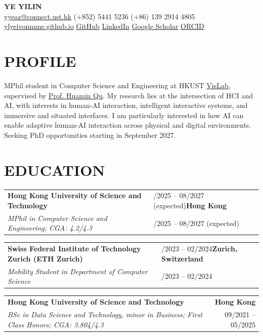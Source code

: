 \documentclass[9pt,a4paper]{extarticle}
\makeatletter
\newcommand{\cventry}[5]{%
  \begin{tabularx}{\textwidth}{@{}X>{\raggedleft\arraybackslash}p{5.0cm}@{}}
    \textbf{#1} & \if\relax\detokenize{#2}\relax #4\else\textbf{#2}\fi \\
    \textit{#3} & \if\relax\detokenize{#2}\relax\else #4\fi
  \end{tabularx}
  #5\par\vspace{0.8pt}
}
\makeatother
\begin{document}
\pagestyle{empty}
\fontsize{9.5}{10.5}\selectfont

\begin{center}
  {\fontsize{19}{21}\selectfont\bfseries YE YILIN}\\[4pt]
  \href{mailto:yyeaz@connect.ust.hk}{yyeaz@connect.ust.hk}
  \enspace\textbar\enspace (+852) 5441 5236
  \enspace\textbar\enspace (+86) 139 2914 4805\\[2pt]
  \href{https://ylyeivonnnne.github.io}{ylyeivonnnne.github.io}
  \enspace\textbar\enspace
  \href{https://github.com/ylyeivonnnne}{GitHub}
  \enspace\textbar\enspace
  \href{https://www.linkedin.com/in/yilin-ye-811ab0252/}{LinkedIn}
  \enspace\textbar\enspace
  \href{https://scholar.google.com/citations?hl=en&user=fhwz3soAAAAJ}{Google Scholar}
  \enspace\textbar\enspace
  \href{https://orcid.org/0009-0000-9986-4420}{ORCID}
\end{center}
\vspace{-5pt}

\section{PROFILE}

MPhil student in Computer Science and Engineering at HKUST \href{http://vis.cse.ust.hk/index.html}{VisLab}, supervised by \href{http://huamin.org}{Prof. Huamin Qu}. My research lies at the intersection of HCI and AI, with interests in human-AI interaction, intelligent interactive systems, and immersive and situated interfaces. I am particularly interested in how AI can enable adaptive human-AI interaction across physical and digital environments. Seeking PhD opportunities starting in September 2027.

\section{EDUCATION}

\cventry{Hong Kong University of Science and Technology}{Hong Kong}{MPhil in Computer Science and Engineering; CGA: 4.2/4.3}{09/2025 -- 08/2027 (expected)}{}

\cventry{Swiss Federal Institute of Technology Zurich (ETH Zurich)}{Zurich, Switzerland}{Mobility Student in Department of Computer Science}{09/2023 -- 02/2024}{}

\begin{tabularx}{\textwidth}{@{}Xr@{}}
\textbf{Hong Kong University of Science and Technology} & \textbf{Hong Kong} \\
\textit{BSc in Data Science and Technology, minor in Business; First Class Honors; CGA: 3.804/4.3} & 09/2021 -- 05/2025
\end{tabularx}\par\vspace{0.8pt}
\end{document}
